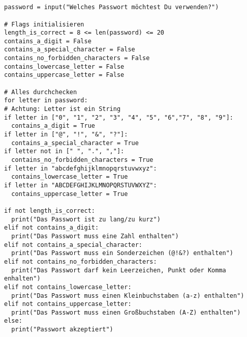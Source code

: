 \documentclass[a4paper]{article}
\begin{document}
\section{}
\begin{verbatim}
password = input("Welches Passwort möchtest Du verwenden?")

# Flags initialisieren
length_is_correct = 8 <= len(password) <= 20
contains_a_digit = False
contains_a_special_character = False
contains_no_forbidden_characters = False
contains_lowercase_letter = False
contains_uppercase_letter = False

# Alles durchchecken
for letter in password:
# Achtung: Letter ist ein String
if letter in ["0", "1", "2", "3", "4", "5", "6","7", "8", "9"]:
  contains_a_digit = True
if letter in ["@", "!", "&", "?"]:
  contains_a_special_character = True
if letter not in [" ", ".", ","]:
  contains_no_forbidden_characters = True
if letter in "abcdefghijklmnopqrstuvwxyz":
  contains_lowercase_letter = True
if letter in "ABCDEFGHIJKLMNOPQRSTUVWXYZ":
  contains_uppercase_letter = True

if not length_is_correct:
  print("Das Passwort ist zu lang/zu kurz")
elif not contains_a_digit:
  print("Das Passwort muss eine Zahl enthalten")
elif not contains_a_special_character:
  print("Das Passwort muss ein Sonderzeichen (@!&?) enthalten")
elif not contains_no_forbidden_characters:
  print("Das Passwort darf kein Leerzeichen, Punkt oder Komma enhalten")
elif not contains_lowercase_letter:
  print("Das Passwort muss einen Kleinbuchstaben (a-z) enthalten")
elif not contains_uppercase_letter:
  print("Das Passwort muss einen Großbuchstaben (A-Z) enthalten")
else:
  print("Passwort akzeptiert")
\end{verbatim}
\end{document}
